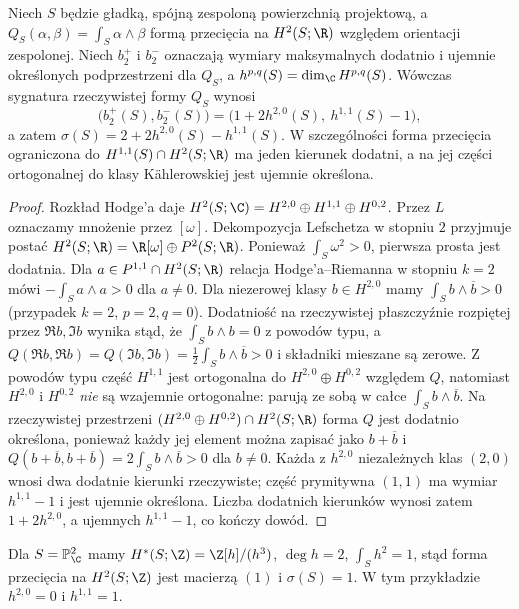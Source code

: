 \begin{twierdzenie}
\label{thm:xvii-hodge-index}
Niech $S$ będzie gładką, spójną zespoloną
powierzchnią projektową, a
$Q_S(\alpha,\beta)=\int_S\alpha\wedge\beta$
formą przecięcia na $H^2(S;\R)$
względem orientacji zespolonej.
Niech $b_2^+$ i $b_2^-$ oznaczają wymiary
maksymalnych dodatnio i ujemnie określonych
podprzestrzeni dla $Q_S$, a
$h^{p,q}(S)=\dim_\C H^{p,q}(S)$.
Wówczas sygnatura rzeczywistej formy $Q_S$ wynosi
\[
\bigl(b_2^+(S),b_2^-(S)\bigr)
=\bigl(1+2h^{2,0}(S),\ h^{1,1}(S)-1\bigr),
\]
a zatem $\sigma(S)=2+2h^{2,0}(S)-h^{1,1}(S)$.
W szczególności forma przecięcia ograniczona do
$H^{1,1}(S)\cap H^2(S;\R)$ ma jeden kierunek dodatni,
a na jej części ortogonalnej do klasy Kählerowskiej
jest ujemnie określona.
\end{twierdzenie}
\begin{proof}
Rozkład Hodge'a daje
$H^2(S;\C)=H^{2,0}\oplus H^{1,1}\oplus H^{0,2}$.
Przez $L$ oznaczamy mnożenie przez $[\omega]$.
Dekompozycja Lefschetza w stopniu $2$ przyjmuje postać
$H^2(S;\R)=\R[\omega]\oplus P^2(S;\R)$.
Ponieważ $\int_S\omega^2>0$, pierwsza prosta jest dodatnia.
Dla $a\in P^{1,1}\cap H^2(S;\R)$ relacja
Hodge'a--Riemanna w stopniu $k=2$ mówi
$-\int_S a\wedge a>0$ dla $a\ne0$.
Dla niezerowej klasy $b\in H^{2,0}$ mamy
$\int_S b\wedge\overline b>0$ (przypadek $k=2$, $p=2,q=0$).
Dodatniość na rzeczywistej płaszczyźnie
rozpiętej przez $\Re b,\Im b$ wynika stąd, że
$\int_S b\wedge b=0$ z powodów typu, a
$Q(\Re b,\Re b)=Q(\Im b,\Im b)
=\frac12\int_S b\wedge\overline b>0$ i składniki
mieszane są zerowe. Z powodów typu część $H^{1,1}$ jest ortogonalna do
$H^{2,0}\oplus H^{0,2}$ względem $Q$, natomiast
$H^{2,0}$ i $H^{0,2}$ \emph{nie} są wzajemnie ortogonalne:
parują ze sobą w całce $\int_S b\wedge\overline b$.
Na rzeczywistej przestrzeni $(H^{2,0}\oplus H^{0,2})\cap
H^2(S;\R)$ forma $Q$ jest dodatnio określona,
ponieważ każdy jej element można zapisać jako $b+\overline b$
i $Q(b+\overline b,b+\overline b)=2\int_S b\wedge\overline b>0$
dla $b\ne0$.
Każda z $h^{2,0}$ niezależnych klas $(2,0)$ wnosi
dwa dodatnie kierunki rzeczywiste; część prymitywna
$(1,1)$ ma wymiar $h^{1,1}-1$ i jest ujemnie określona.
Liczba dodatnich kierunków wynosi zatem $1+2h^{2,0}$,
a ujemnych $h^{1,1}-1$, co kończy dowód.
\end{proof}
\begin{przyklad}
Dla $S=\mathbb P^2_\C$ mamy
$H^*(S;\Z)=\Z[h]/(h^3)$, $\deg h=2$,
$\int_S h^2=1$, stąd forma przecięcia na
$H^2(S;\Z)$ jest macierzą $(1)$ i $\sigma(S)=1$.
W tym przykładzie $h^{2,0}=0$ i $h^{1,1}=1$.
\end{przyklad}


